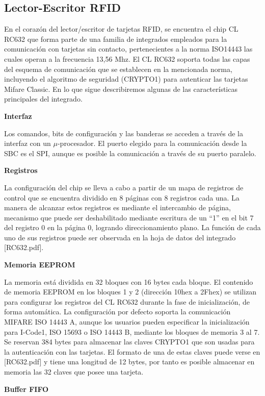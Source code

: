 \subsection{Lector-Escritor RFID}
En el corazón del lector/escritor de tarjetas RFID, se encuentra el chip CL RC632 que forma parte de una familia de integrados empleados para la comunicación con tarjetas sin contacto, pertenecientes a la norma ISO14443 las cuales operan a la frecuencia 13,56 Mhz.
El CL RC632 soporta todas las capas del esquema de comunicación que se establecen en la mencionada norma, incluyendo el algoritmo de seguridad (CRYPTO1) para autenticar las tarjetas Mifare Classic. En lo que sigue describiremos algunas de las características principales del integrado.

\bigskip
{\bf{Interfaz}}

Los comandos, bits de configuración y las banderas se acceden a través de la interfaz con un $\mu$-procesador. El puerto elegido para la comunicación desde la SBC es el SPI, aunque es posible la comunicación a través de su puerto paralelo. 

\bigskip
{\bf{Registros}}

La configuración del chip se lleva a cabo a partir de un mapa de registros de control que se encuentra dividido en 8 páginas con 8 registros cada una. La manera de alcanzar estos registros es mediante el intercambio de página, mecanismo que puede ser deshabilitado mediante escritura de un “1” en el bit 7 del registro 0 en la página 0, logrando direccionamiento plano. La función de cada uno de sus registros puede ser observada en la hoja de datos del integrado [RC632.pdf].

\bigskip
{\bf{Memoria EEPROM}}

La memoria está dividida en 32 bloques con 16 bytes cada bloque.
El contenido de memoria EEPROM en los bloques 1 y 2 (dirección 10hex a 2Fhex) se utilizan para configurar los registros del CL RC632 durante la fase de inicialización, de forma automática.
La configuración por defecto soporta la comunicación MIFARE ISO 14443 A, aunque los usuarios pueden especificar la inicialización para I-Code1, ISO 15693 o ISO 14443 B, mediante los bloques de memoria 3 al 7.
Se reservan 384 bytes para almacenar las claves CRYPTO1 que son usadas para la autenticación con las tarjetas. El formato de una de estas claves puede verse en [RC632.pdf] y tiene una longitud de 12 bytes, por tanto es posible almacenar en memoria las 32 claves que posee una tarjeta.

\bigskip
{\bf{Buffer FIFO}}

